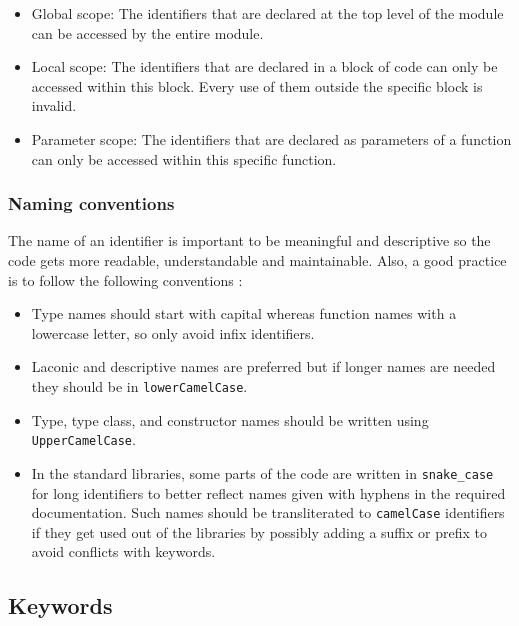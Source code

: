 \documentclass[a4paper, titlepage, twoside]{article}
\begin{document}
\begin{itemize}
\item Global scope: The identifiers that are declared at the top level of the module can be accessed by the entire module.

\item Local scope: The identifiers that are declared in a block of code can only be accessed within this block. Every use of them outside the specific block is invalid.

\item Parameter scope: The identifiers that are declared as parameters of a function can only be accessed within this specific function.
\end{itemize}

\subsubsection{Naming conventions}
\label{sec:org587a599}

The name of an identifier is important to be meaningful and descriptive so the code gets more readable, understandable and maintainable. Also, a good practice is to follow the following conventions \autocite{haskellwikiProgrammingGuidelinesHaskellWiki2022}:

\begin{itemize}
\item Type names should start with capital whereas function names with a lowercase letter, so only avoid infix identifiers.

\item Laconic and descriptive names are preferred but if longer names are needed they should be in \texttt{lowerCamelCase}.

\item Type, type class, and constructor names should be written using \texttt{UpperCamelCase}.

\item In the standard libraries, some parts of the code are written in \texttt{snake\_case} for long identifiers to better reflect names given with hyphens in the required documentation. Such names should be transliterated to \texttt{camelCase} identifiers if they get used out of the libraries by possibly adding a suffix or prefix to avoid conflicts with keywords.
\end{itemize}

\subsection{Keywords}
\label{sec:orgd42d384}
\end{document}
